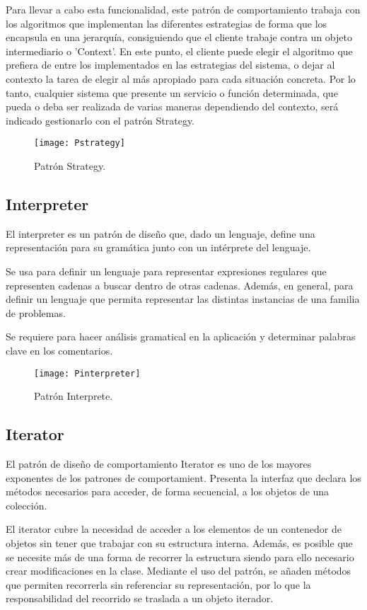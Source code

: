 Para llevar a cabo esta funcionalidad, este patrón de comportamiento trabaja con los algoritmos que implementan las diferentes estrategias de forma que los encapsula en una jerarquía, consiguiendo que el cliente trabaje contra un objeto intermediario o 'Context'. En este punto, el cliente puede elegir el algoritmo que prefiera de entre los implementados en las estrategias del sistema, o dejar al contexto la tarea de elegir al más apropiado para cada situación concreta.
Por lo tanto, cualquier sistema que presente un servicio o función determinada, que pueda o deba ser realizada de varias maneras dependiendo del contexto, será indicado gestionarlo con el patrón Strategy.

\begin{figure}[H]
\centering
\texttt{[image: Pstrategy]}
\caption{Patrón Strategy.}
\end{figure}

\subsection{Interpreter}

El interpreter es un patrón de diseño que, dado un lenguaje, define una representación para su gramática junto con un intérprete del lenguaje.

Se usa para definir un lenguaje para representar expresiones regulares que representen cadenas a buscar dentro de otras cadenas. Además, en general, para definir un lenguaje que permita representar las distintas instancias de una familia de problemas.

Se requiere para hacer análisis gramatical en la aplicación y determinar palabras clave en los comentarios.

\begin{figure}[H]
\centering
\texttt{[image: Pinterpreter]}
\caption{Patrón Interprete.}
\end{figure}

\subsection{Iterator}

El patrón de diseño de comportamiento Iterator es uno de los mayores exponentes de los patrones de comportamient. Presenta la interfaz que declara los métodos necesarios para acceder, de forma secuencial, a los objetos de una colección.

El iterator cubre la necesidad de acceder a los elementos de un contenedor de objetos sin tener que trabajar con su estructura interna. Además, es posible que se necesite más de una forma de recorrer la estructura siendo para ello necesario crear modificaciones en la clase. Mediante el uso del patrón, se añaden métodos que permiten recorrerla sin referenciar su representación, por lo que la responsabilidad del recorrido se traslada a un objeto iterador.

